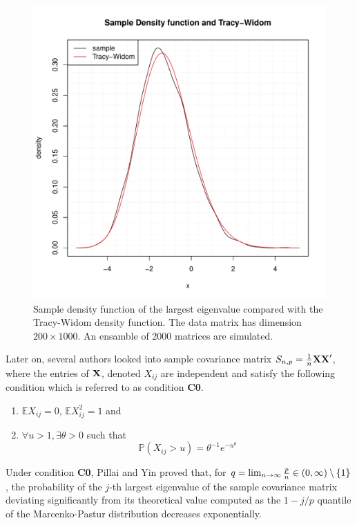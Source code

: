 \documentclass[11pt,reqno]{amsart}
\newcommand{\E}{\mathbb{E}}
\renewcommand{\P}{\mathbb{P}}
\newcommand{\1}{\mathds{1}}
\newcommand{\0}{\boldsymbol{0}}
\newcommand{\4}{\mathchoice{\mskip1.5mu}{\mskip1.5mu}{}{}}
\newcommand{\5}{\mathchoice{\mskip-1.5mu}{\mskip-1.5mu}{}{}}
\newcommand{\2}{\penalty250\mskip\thickmuskip\mskip-\thinmuskip} %
\begin{document}
\begin{figure}[htb!]
  \centering
  \includegraphics[scale=0.5]{normal-TW.pdf}
  \caption{Sample density function of the largest eigenvalue compared
    with the Tracy-Widom density function. The data matrix has
    dimension $200 \times 1000$. An ensamble of 2000 matrices are
    simulated.}
  \label{fig:normal-TW}
\end{figure}

Later on, several authors \cite{Pillai:Yin:2011, tao:vu:2012,
  Wang:2012} looked into sample covariance matrix $S_{n, p} = {1
  \over n} \bf{XX}'$, where the entries of $\bf X$, denoted $X_{ij}$
are independent and satisfy the following condition which is referred
to as condition {\bf C0}.
\begin{enumerate}
\item $\E X_{ij} = 0$, $\E X_{ij}^2 = 1$ and
\item $\forall u > 1, \exists \theta > 0$ such that
  \[
  \P(X_{ij} > u) = \theta^{-1} e^{-u^{\theta}}
  \]
\end{enumerate}
Under condition {\bf C0}, Pillai and Yin \cite{Pillai:Yin:2011} proved
that, for $q = \lim_{n \to \infty} {p \over n} \in (0, \infty)
\setminus \{1\}$, the probability of the $j$-th largest eigenvalue of
the sample covariance matrix deviating significantly from its
theoretical value computed as the $1 - j/p$ quantile of the
Marcenko-Pastur distribution decreases exponentially\footnotemark.
\end{document}

